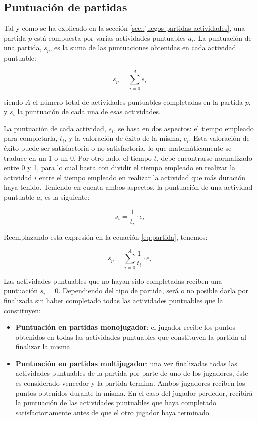 \subsection{Puntuación de partidas}

Tal y como se ha explicado en la sección \ref{sec::juegos-partidas-actividades}, una partida $p$ está compuesta por varias actividades puntuables $a_i$. La puntuación de una partida, $s_{p}$, es la suma de las puntuaciones obtenidas en cada actividad puntuable:


\begin{equation}
s_{p} = \sum\limits_{i = 0}^A s_i
\label{eq:partida}
\end{equation}

siendo $A$ el número total de actividades puntuables completadas en la partida $p$, y $s_i$ la puntuación de cada una de esas actividades.

La puntuación de cada actividad, $s_i$, se basa en dos aspectos: el tiempo empleado para completarla, $t_i$, y la valoración de éxito de la misma, $e_i$. Esta valoración de éxito puede ser satisfactoria o no satisfactoria, lo que matemáticamente se traduce en un 1 o un 0. Por otro lado, el tiempo $t_i$ debe encontrarse normalizado entre 0 y 1, para lo cual basta con dividir el tiempo empleado en realizar la actividad $i$ entre el tiempo empleado en realizar la actividad que más duración haya tenido. Teniendo en cuenta ambos aspectos, la puntuación de una actividad puntuable $a_i$ es la siguiente:

\begin{equation}
s_i = \frac{1}{t_i} \cdot e_i
\end{equation}

Reemplazando esta expresión en la ecuación \ref{eq:partida}, tenemos:

\begin{equation}
s_{p} = \sum\limits_{i = 0}^A \frac{1}{t_i} \cdot e_i
\end{equation}

Las actividades puntuables que no hayan sido completadas reciben una puntuación $s_i = 0$. Dependiendo del tipo de partida, será o no posible darla por finalizada sin haber completado todas las actividades puntuables que la constituyen:

\begin{itemize}
\item {\bf Puntuación en partidas monojugador}: el jugador recibe los puntos obtenidos en todas las actividades puntuables que constituyen la partida al finalizar la misma.
\item {\bf Puntuación en partidas multijugador}: una vez finalizadas todas las actividades puntuables de la partida por parte de uno de los jugadores, éste es considerado vencedor y la partida termina. Ambos jugadores reciben los puntos obtenidos durante la misma. En el caso del jugador perdedor, recibirá la puntuación de las actividades puntuables que haya completado satisfactoriamente antes de que el otro jugador haya terminado.
\end{itemize}

